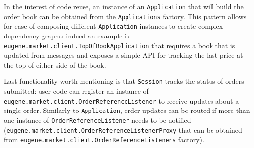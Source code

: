 In the interest of code reuse, an instance of an \texttt{Application} that will build the order book can be obtained from the \texttt{Applications} factory. This pattern allows for ease of composing different \texttt{Application} instances to create complex dependency graphs: indeed an example is \texttt{eugene.market.client.TopOfBookApplication} that requires a book that is updated from messages and exposes a simple API for tracking the last price at the top of either side of the book.

Last functionality worth mentioning is that \texttt{Session} tracks the status of orders submitted: user code can register an instance of \\ \texttt{eugene.market.client.OrderReferenceListener} to receive updates about a single order. Similarly to \texttt{Application}, order updates can be routed if more than one instance of \texttt{OrderReferenceListener} needs to be notified \\ (\texttt{eugene.market.client.OrderReferenceListenerProxy} that can be obtained from \texttt{eugene.market.client.OrderReferenceListeners} factory).